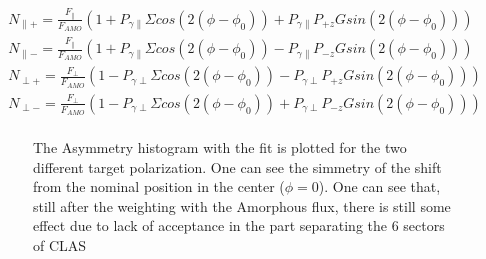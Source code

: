 \begin{eqnarray}
N_{\parallel +} = \frac{F_{\parallel}}{F_{AMO}} \left( 1 + P_{\gamma \parallel}\Sigma cos(2(\phi-\phi_0)) + P_{\gamma \parallel} P_{+z} G sin(2(\phi-\phi_0)) \right) \\
N_{\parallel -} = \frac{F_{\parallel}}{F_{AMO}} \left( 1 + P_{\gamma \parallel}\Sigma cos(2(\phi-\phi_0)) - P_{\gamma \parallel} P_{-z} G sin(2(\phi-\phi_0)) \right) \\
N_{\perp +} = \frac{F_{\perp}}{F_{AMO}} \left( 1 - P_{\gamma \perp}\Sigma cos(2(\phi-\phi_0)) - P_{\gamma \perp} P_{+z} G sin(2(\phi-\phi_0)) \right) \\
N_{\perp -} = \frac{F_{\perp}}{F_{AMO}} \left( 1 - P_{\gamma \perp}\Sigma cos(2(\phi-\phi_0)) + P_{\gamma \perp} P_{-z} G sin(2(\phi-\phi_0)) \right) \\
\end{eqnarray}
\begin{figure}[htb]
  \begin{center}
    \caption{The Asymmetry histogram with the fit is plotted for the two different target polarization. One can see the simmetry of the shift from the nominal position in the center ($\phi = 0$).  One can see that, still after the weighting with the Amorphous flux, there is still some effect due to lack of acceptance in the part separating the 6 sectors of CLAS}
  \end{center}
\end{figure}

